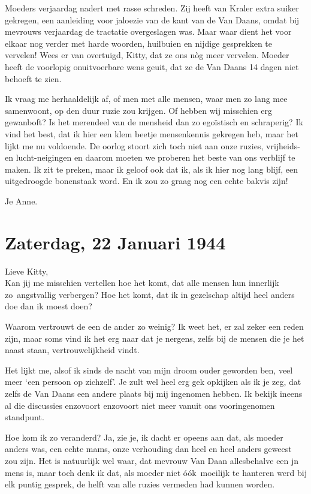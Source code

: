 \documentclass{book}
\begin{document}
Moeders verjaardag nadert met rasse schreden. Zij heeft van Kraler extra
suiker gekregen, een aanleiding voor jaloezie van de kant van de Van
Daans, omdat bij mevrouws verjaardag de tractatie overgeslagen was. Maar
waar dient het voor elkaar nog verder met harde woorden, huilbuien en
nijdige gesprekken te vervelen! Wees er van overtuigd, Kitty, dat ze ons
nòg meer vervelen. Moeder heeft de voorlopig onuitvoerbare wens geuit,
dat ze de Van Daans 14 dagen niet behoeft te zien.

Ik vraag me herhaaldelijk af, of men met alle mensen, waar men zo lang
mee samenwoont, op den duur ruzie zou krijgen. Of hebben wij misschien
erg gewanboft? Is het merendeel van de mensheid dan zo egoïstisch en
schraperig? Ik vind het best, dat ik hier een klem beetje mensenkennis
gekregen heb, maar het lijkt me nu voldoende. De oorlog stoort zich toch
niet aan onze ruzies, vrijheids- en lucht-neigingen en daarom moeten we
proberen het beste van ons verblijf te maken. Ik zit te preken, maar ik
geloof ook dat ik, als ik hier nog lang blijf, een uitgedroogde
bonenstaak word. En ik zou zo graag nog een echte bakvis zijn!

Je Anne.

\chapter{Zaterdag, 22 Januari 1944}

Lieve Kitty,\\Kan jij me misschien vertellen hoe het komt, dat alle
mensen hun innerlijk zo~angstvallig verbergen? Hoe het komt, dat ik in
gezelschap altijd heel anders doe dan ik moest doen?

Waarom vertrouwt de een de ander zo weinig? Ik weet het, er zal zeker
een reden zijn, maar soms vind ik het erg naar dat je nergens, zelfs bij
de mensen die je het naast staan, vertrouwelijkheid vindt.

Het lijkt me, alsof ik sinds de nacht van mijn droom ouder geworden ben,
veel meer `een persoon op zichzelf'. Je zult wel heel erg gek opkijken
als ik je zeg, dat zelfs de Van Daans een andere plaats bij mij
ingenomen hebben. Ik bekijk ineens al die discussies enzovoort enzovoort
niet meer vanuit ons vooringenomen standpunt.

Hoe kom ik zo veranderd? Ja, zie je, ik dacht er opeens aan dat, als
moeder anders was, een echte mams, onze verhouding dan heel en heel
anders geweest zou zijn. Het is natuurlijk wel waar, dat mevrouw Van
Daan allesbehalve een jn mens is, maar toch denk ik dat, als moeder niet
óók~moeilijk te hanteren werd bij elk puntig gesprek, de helft van alle
ruzies vermeden had kunnen worden.
\end{document}
